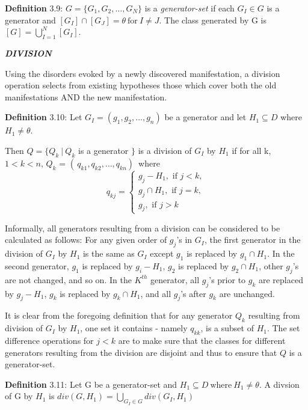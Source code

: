 \documentclass{article}
\begin{document}
\par 
\textbf{Definition} 3.9: $G = \{G_1, G_2, \ldots, G_N\}$ is a
\textit{generator-set} if each $G_I \in G$ is a generator and $[G_I] \cap
[G_J] = \theta\ \text{for}\ I \neq J$. 
The class generated by G is $[G] = \bigcup\limits_{I=1}^{N}[G_I]$.
\newline
\newline
\par
\textit{\textbf{DIVISION}}
\newline
\par
Using the disorders evoked by a newly discovered manifestation, a division
operation selects from existing hypotheses those which cover both the old
manifestations AND the new manifestation.
\newline
\par
\textbf{Definition} 3.10: Let $G_I = (g_1, g_2, \ldots, g_n)$ be a generator 
and let $H_1 \subseteq D$ where $H_1 \neq \theta$. 

Then $Q = \{ Q_k \:|\:Q_k$ is a generator $\}$ is a division of $G_I$ by $H_1$
if for all k, $1 < k < n$, $Q_k$ = $( \, q_{k1}, q_{k2}, \ldots, q_{kn} ) \,$ where
\[
  q_{kj} =
	\begin{cases}
		g_j - H_1, \text{ if } j < k,\\
		g_j \cap H_1, \text{ if } j = k,\\
		g_j, \text{ if } j > k
	\end{cases}
\]
\par
Informally, all generators resulting from a division can be considered to be
calculated as follows: \newline
For any given order of $g_j$'s in $G_I$, the first generator in the division of
$G_I$ by $H_1$ is the same as $G_I$ except $g_1$ is replaced by $g_1 \cap H_1$.
In the second generator, $g_1$ is replaced by $g_i - H_1$, $g_2$ is replaced by
$g_2 \cap H_1$, other $g_j$'s are not changed, and so on. In the $K^{th}$
generator, all $g_j$'s prior to $g_k$ are replaced by $g_j - H_1$, $g_k$ is
replaced by $g_k \cap H_1$, and all $g_j$'s after $g_k$ are unchanged. 
\par
It is clear from the foregoing definition that for any generator $Q_k$ resulting
from division of $G_I$ by $H_1$, one set it contains - namely $q_{kk}$, is a
subset of $H_1$. The set difference operations for $j < k$ are to make sure that
the classes for different generators resulting from the division are disjoint
and thus to ensure that $Q$ is a generator-set. 
\newline
\par 
\textbf{Definition} 3.11: Let G be a generator-set and $H_1 \subseteq D\
\text{where}\ H_1 \neq \theta$. A divsion of G by $H_1$ is $div(G, H_1) =
\bigcup\limits_{G_I \in G} div(G_I, H_1)$
\newline
\end{document}
